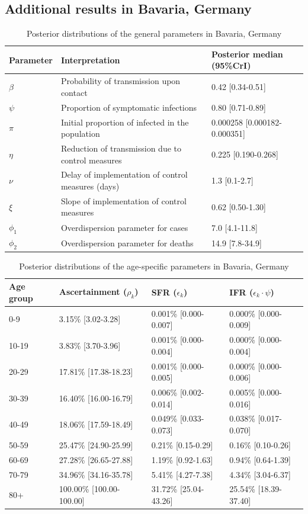 \documentclass{article}
\begin{document}
\subsection{Additional results in Bavaria, Germany}
\begin{table}[H]
	\centering
	\begin{tabular}{lll}
		\hline
		Parameter & Interpretation & Posterior median (95\%CrI) \\ 
		\hline
		$\beta$ & Probability of transmission upon contact & 0.42 [0.34-0.51] \\ 
		$\psi$ & Proportion of symptomatic infections & 0.80 [0.71-0.89] \\ 
		$\pi$ & Initial proportion of infected in the population & 0.000258 [0.000182-0.000351] \\ 
		$\eta$ & Reduction of transmission due to control measures & 0.225 [0.190-0.268] \\ 
		$\nu$ & Delay of implementation of control measures (days) & 1.3 [0.1-2.7] \\ 
		$\xi$ & Slope of implementation of control measures & 0.62 [0.50-1.30] \\ 
		$\phi_1$ & Overdispersion parameter for cases & 7.0 [4.1-11.8] \\ 
		$\phi_2$ & Overdispersion parameter for deaths & 14.9 [7.8-34.9] \\ 
		\hline
	\end{tabular}
	\caption{Posterior distributions of the general parameters in Bavaria, Germany} 
\end{table}
\begin{table}[H]
	\centering
	\begin{tabular}{llll}
		\hline
		Age group & Ascertainment ($\rho_k$) & SFR ($\epsilon_k$) & IFR ($\epsilon_k\cdot\psi$) \\ 
		\hline
		0-9 & 3.15\% [3.02-3.28] & 0.001\% [0.000-0.007] & 0.000\% [0.000-0.009] \\ 
		10-19 & 3.83\% [3.70-3.96] & 0.001\% [0.000-0.004] & 0.000\% [0.000-0.004] \\ 
		20-29 & 17.81\% [17.38-18.23] & 0.001\% [0.000-0.005] & 0.000\% [0.000-0.006] \\ 
		30-39 & 16.40\% [16.00-16.79] & 0.006\% [0.002-0.014] & 0.005\% [0.000-0.016] \\ 
		40-49 & 18.06\% [17.59-18.49] & 0.049\% [0.033-0.073] & 0.038\% [0.017-0.070] \\ 
		50-59 & 25.47\% [24.90-25.99] & 0.21\% [0.15-0.29] & 0.16\% [0.10-0.26] \\ 
		60-69 & 27.28\% [26.65-27.88] & 1.19\% [0.92-1.63] & 0.94\% [0.64-1.39] \\ 
		70-79 & 34.96\% [34.16-35.78] & 5.41\% [4.27-7.38] & 4.34\% [3.04-6.37] \\ 
		80+ & 100.00\% [100.00-100.00] & 31.72\% [25.04-43.26] & 25.54\% [18.39-37.40] \\ 
		\hline
	\end{tabular}
	\caption{Posterior distributions of the age-specific parameters in Bavaria, Germany} 
\end{table}
\clearpage
\end{document}
